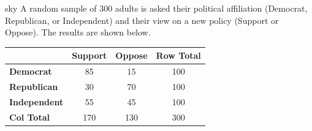 \documentclass[10pt]{article}
\begin{document}
\vspace{0.08in}

\begin{scenariobox}{sky}
A random sample of 300 adults is asked their political affiliation (Democrat, Republican,
or Independent) and their view on a new policy (Support or Oppose).
The results are shown below.

\vspace{0.08in}
\renewcommand{\arraystretch}{1.4}
\begin{tabularx}{0.72\linewidth}{l ccc}
    & \textbf{Support} & \textbf{Oppose} & \textbf{Row Total} \\
    \hline
    \textbf{Democrat}    & 85 & 15  & 100 \\
    \textbf{Republican}  & 30 & 70  & 100 \\
    \textbf{Independent} & 55 & 45  & 100 \\
    \hline
    \textbf{Col Total}   & 170 & 130 & 300 \\
\end{tabularx}
\end{scenariobox}
\end{document}
